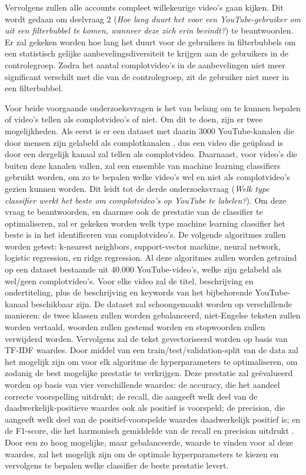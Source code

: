 \documentclass[../main.tex]{subfiles}
\begin{document}
Vervolgens zullen alle accounts compleet willekeurige video's gaan kijken. Dit wordt gedaan om deelvraag 2 (\textit{Hoe lang duurt het voor een YouTube-gebruiker om uit een filterbubbel te komen, wanneer deze zich erin bevindt?}) te beantwoorden. Er zal gekeken worden hoe lang het duurt voor de gebruikers in filterbubbels om een statistisch gelijke aanbevelingsdiversiteit te krijgen aan de gebruikers in de controlegroep. Zodra het aantal complotvideo's in de aanbevelingen niet meer significant verschilt met die van de controlegroep, zit de gebruiker niet meer in een filterbubbel.

Voor beide voorgaande onderzoeksvragen is het van belang om te kunnen bepalen of video's tellen als complotvideo's of niet. Om dit te doen, zijn er twee mogelijkheden. Als eerst is er een dataset met daarin 3000 YouTube-kanalen die door mensen zijn gelabeld als complotkanalen \citep{ledwich2019algorithmic}, dus een video die geüpload is door een dergelijk kanaal zal tellen als complotvideo. Daarnaast, voor video’s die buiten deze kanalen vallen, zal een ensemble van machine learning classifiers gebruikt worden, om zo te bepalen welke video’s wel en niet als complotvideo’s gezien kunnen worden. Dit leidt tot de derde onderzoeksvraag (\textit{Welk type classifier werkt het beste om complotvideo’s op YouTube te labelen?}). Om deze vraag te beantwoorden, en daarmee ook de prestatie van de classifier te optimaliseren, zal er gekeken worden welk type machine learning classifier het beste is in het identificeren van complotvideo’s. De volgende algoritmes zullen worden getest: k-nearest neighbors, support-vector machine, neural network, logistic regression, en ridge regression. Al deze algoritmes zullen worden getraind op een dataset bestaande uit 40.000 YouTube-video’s, welke zijn gelabeld als wel/geen complotvideo’s. Voor elke video zal de titel, beschrijving en ondertiteling, plus de beschrijving en keywords van het bijbehorende YouTube-kanaal beschikbaar zijn. De dataset zal schoongemaakt worden op verschillende manieren: de twee klassen zullen worden gebalanceerd, niet-Engelse teksten zullen worden vertaald, woorden zullen gestemd worden en stopwoorden zullen verwijderd worden. Vervolgens zal de tekst gevectoriseerd worden op basis van TF-IDF waardes. Door middel van een train/test/validation-split van de data zal het mogelijk zijn om voor elk algoritme de hyperparameters te optimaliseren, om zodanig de best mogelijke prestatie te verkrijgen. Deze prestatie zal geëvalueerd worden op basis van vier verschillende waardes: de accuracy, die het aandeel correcte voorspelling uitdrukt; de recall, die aangeeft welk deel van de daadwerkelijk-positieve waardes ook als positief is voorspeld; de precision, die aangeeft welk deel van de positief-voorspelde waardes daadwerkelijk positief is; en de F1-score, die het harmonisch gemiddelde van de recall en precision uitdrukt \citep{sokolova2009systematic}. Door een zo hoog mogelijke, maar gebalanceerde, waarde te vinden voor al deze waardes, zal het mogelijk zijn om de optimale hyperparameters te kiezen en vervolgens te bepalen welke classifier de beste prestatie levert.
\end{document}
